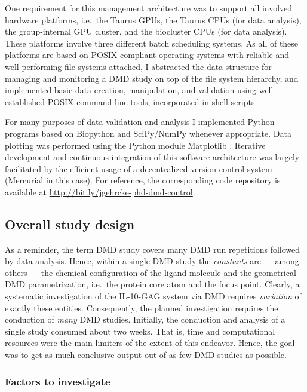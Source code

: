One requirement for this management architecture was to support all involved
hardware platforms, i.e.\ the Taurus GPUs, the Taurus CPUs (for data analysis),
the group-internal GPU cluster, and the biocluster CPUs (for data analysis).
These platforms involve three different batch scheduling systems. As all of
these platforms are based on POSIX-compliant operating systems with reliable and
well-performing file systems attached, I abstracted the data structure for
managing and monitoring a DMD study on top of the file system hierarchy, and
implemented basic data creation, manipulation, and validation using
well-established POSIX command line tools, incorporated in shell scripts.

For many purposes of data validation and analysis I implemented Python
programs based on Biopython \cite{biopython_web} and SciPy/NumPy
\cite{scipy_numpy} whenever appropriate. Data plotting was performed using
the Python module Matplotlib \cite{matplotlib_web}. Iterative development and
continuous integration of this software architecture was largely facilitated by
the efficient usage of a decentralized version control system (Mercurial
\cite{mercurial_web} in this case). For reference, the corresponding code
repository is available at \url{http://bit.ly/jgehrcke-phd-dmd-control}.


\subsection{Overall study design}
\label{dmdil10:overallmethod}

As a reminder, the term DMD study covers many DMD run repetitions followed by
data analysis. Hence, within a single DMD study the \textit{constants} are ---
among others --- the chemical configuration of the ligand molecule and the
geometrical DMD parametrization, i.e.\ the protein core atom and the focus
point. Clearly, a systematic investigation of the IL-10-GAG system via DMD
requires \textit{variation} of exactly these entities. Consequently, the planned
investigation requires the conduction of \textit{many} DMD studies. Initially,
the conduction and analysis of a single study consumed about two weeks. That is,
time and computational resources were the main limiters of the extent of this
endeavor. Hence, the goal was to get as much conclusive output out of as few DMD
studies as possible.

\subsubsection{Factors to investigate}

